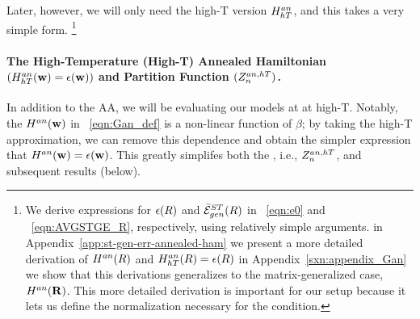 Later, however, we will only need the high-T version $H^{an}_{hT}$, and this takes a very simple form.
\footnote{We derive expressions for $\epsilon(R)$ and $\bar{\mathcal{E}}^{ST}_{gen}(R)$ in \EQN~\ref{eqn:e0} and \EQN~\ref{eqn:AVGSTGE_R}, respectively, using relatively simple arguments.
in Appendix~\ref{app:st-gen-err-annealed-ham} we present
a more detailed derivation of $H^{an}(R)$ and $H^{an}_{hT}(R)=\epsilon(R)$
in Appendix~\ref{sxn:appendix_Gan} we show that this derivations generalizes to the matrix-generalized case, $H^{an}(\mathbf{R})$.
This more detailed derivation is important for our \SETOL setup because it lets us define the normalization
necessary for the \TRACELOG condition.
}



\paragraph{The High-Temperature (High-T) Annealed Hamiltonian $(H^{an}_{hT}({\mathbf{w}})=\epsilon({\mathbf{w}}))$ and Partition Function $(Z^{an,hT}_{n})$. }
In addition to the AA, we will be evaluating our models at at high-T.
Notably, the \AnnealedHamiltonian $H^{an}({\mathbf{w}})$ in \EQN~\ref{eqn:Gan_def} is a non-linear function of $\beta$; by
taking the high-T approximation, we can remove this dependence and obtain
the simpler expression that $H^{an}({\mathbf{w}})=\epsilon({\mathbf{w}})$.  This greatly simplifes both
the \PartitionFunction, i.e.,  $Z^{an,hT}_{n}$, and subsequent results (below).

